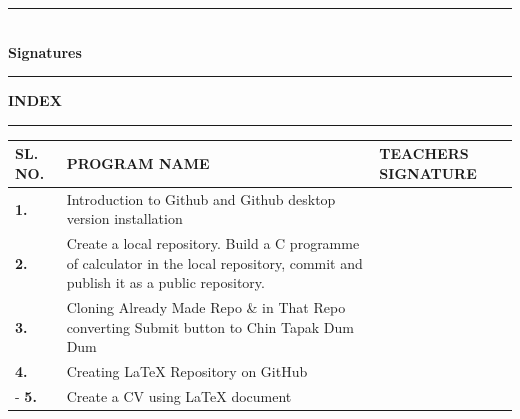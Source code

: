 \documentclass[a4paper,14pt]{article}
\begin{document}
\vspace{2cm}

\begin{flushright}
\rule{5cm}{0.5pt} \\
\textbf{Signatures}
\end{flushright}

\newpage

\begin{center}
    \hrule height 0.5pt
    \vspace{0.3cm}
    {\LARGE \textbf{INDEX}} \\ 
    \vspace{0.3cm}
    \hrule height 0.5pt
\end{center}

\vspace{1cm}

\begin{center}
    \begin{tabular}{|>{\centering\arraybackslash}p{1.5cm}|p{10.5cm}|>{\centering\arraybackslash}p{3cm}|}
        \hline
        \vspace{0.1cm}
        \textbf{SL. NO.} & \vspace{0.1cm} \textbf{PROGRAM NAME} & \vspace{0.1cm} \textbf{TEACHERS SIGNATURE} \vspace{0.1cm} \\ 
        \hline
        \vspace{0.5cm}
        \textbf{1.} & \vspace{0.5cm} Introduction to Github and Github desktop version installation \vspace{0.5cm} &  \\ 
        \hline
        \vspace{0.5cm}
        \textbf{2.} & \vspace{0.5cm} Create a local repository. Build a C programme of calculator in the local repository, commit and publish it as a public repository. \vspace{0.5cm} &  \\ 
        \hline
        \textbf{3.} & \vspace{0.5cm} Cloning Already Made Repo \& in That Repo converting Submit button to Chin Tapak Dum Dum \vspace{0.5cm} &  \\ 
        \hline
        \vspace{0.5cm}
        \textbf{4.} & \vspace{0.5cm} Creating LaTeX Repository on GitHub \vspace{0.5cm} &  \\ 
        \hline
        \vspace{0.5cm}-
        \textbf{5.} & \vspace{0.5cm} Create a CV using LaTeX document \vspace{0.5cm} &  \\ 
        \hline
    \end{tabular}
\end{center}
\end{document}
